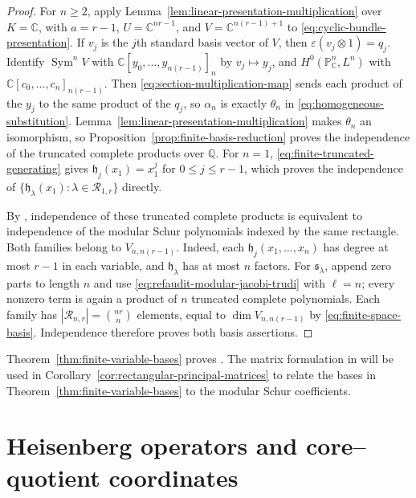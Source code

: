 \documentclass[12pt,reqno,a4paper]{amsart}
\numberwithin{equation}{section}
\numberwithin{figure}{section}
\theoremstyle{plain}
\theoremstyle{definition}
\begin{document}
\begin{proof}
For $n\geq2$, apply
Lemma~\ref{lem:linear-presentation-multiplication} over $K=\mathbb C$, with
$a=r-1$, $U=\mathbb C^{nr-1}$, and $V=\mathbb C^{n(r-1)+1}$
to \eqref{eq:cyclic-bundle-presentation}.
If $v_j$ is the $j$th standard basis vector of $V$, then
$\varepsilon(v_j\otimes1)=q_j$. Identify
$\operatorname{Sym}^nV$ with $\mathbb C[y_0,\ldots,y_{n(r-1)}]_n$
by $v_j\mapsto y_j$, and
$H^0(\mathbb P^n_{\mathbb C},L^n)$ with
$\mathbb C[c_0,\ldots,c_n]_{n(r-1)}$.
Then \eqref{eq:section-multiplication-map} sends each product of
the $y_j$ to the same product of the $q_j$, so $\alpha_n$ is exactly
$\theta_n$ in \eqref{eq:homogeneous-substitution}.
Lemma~\ref{lem:linear-presentation-multiplication} makes $\theta_n$
an isomorphism, so
Proposition~\ref{prop:finite-basis-reduction} proves the independence
of the truncated complete products over $\mathbb Q$.
For $n=1$, \eqref{eq:finite-truncated-generating} gives
$\mathfrak h_j(x_1)=x_1^j$ for $0\leq j\leq r-1$, which proves
the independence of $\{\mathfrak h_\lambda(x_1):
\lambda\in\mathcal R_{1,r}\}$ directly.

By \cite[Proposition~1.5(i), pp.~576--577]{Walker}, independence
of these truncated complete products is equivalent to independence
of the modular Schur polynomials indexed by the same rectangle.
Both families belong to $V_{n,n(r-1)}$.  Indeed, each
$\mathfrak h_j(x_1,\ldots,x_n)$ has degree at most $r-1$ in each
variable, and $\mathfrak h_\lambda$ has at most $n$ factors.
For $\mathfrak s_\lambda$, append zero parts to length $n$ and use
\eqref{eq:refaudit-modular-jacobi-trudi} with $\ell=n$; every nonzero term is again a
product of $n$ truncated complete polynomials.
Each family has $|\mathcal R_{n,r}|=\binom{nr}{n}$ elements,
equal to $\dim V_{n,n(r-1)}$ by \eqref{eq:finite-space-basis}.
Independence therefore proves both basis assertions.
\end{proof}

Theorem~\ref{thm:finite-variable-bases} proves
\cite[Conjecture~1.4 and its equivalent form in Proposition~1.5(i),
pp.~576--577]{Walker}.
The matrix formulation in \cite[Proposition~1.5(ii)]{Walker}
will be used in Corollary~\ref{cor:rectangular-principal-matrices}
to relate the bases in Theorem~\ref{thm:finite-variable-bases}
to the modular Schur coefficients.


\section{Heisenberg operators and core--quotient coordinates}
\label{sec:universal-blocks}
\end{document}
